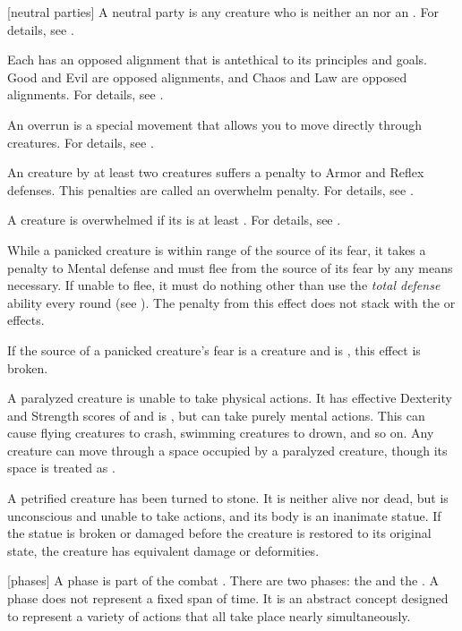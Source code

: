 [neutral parties] A neutral party is any creature who is neither an  nor an .
For details, see .

 Each  has an opposed alignment that is antethical to its principles and goals.
Good and Evil are opposed alignments, and Chaos and Law are opposed alignments.
For details, see .

 An overrun is a special movement that allows you to move directly through creatures.
For details, see .

 An creature  by at least two creatures suffers a  penalty to Armor and Reflex defenses.
This penalties are called an overwhelm penalty.
For details, see .

 A creature is overwhelmed if its  is at least .
For details, see .

 While a panicked creature is within \rngmed range of the source of its fear, it takes a  penalty to Mental defense and must flee from the source of its fear by any means necessary.
If unable to flee, it must do nothing other than use the \textit{total defense} ability every round (see ).
The penalty from this effect does not stack with the  or  effects.

If the source of a panicked creature's fear is a creature and is , this effect is broken.

 A paralyzed creature is unable to take physical actions. It has effective Dexterity and Strength scores of  and is \helpless, but can take purely mental actions. This can cause flying creatures to crash, swimming creatures to drown, and so on. Any creature can move through a space occupied by a paralyzed creature, though its space is treated as .

 A petrified creature has been turned to stone. It is neither alive nor dead, but is unconscious and unable to take actions, and its body is an inanimate statue. If the statue is broken or damaged before the creature is restored to its original state, the creature has equivalent damage or deformities.

[phases] A phase is part of the combat .
There are two phases: the  and the .
A phase does not represent a fixed span of time.
It is an abstract concept designed to represent a variety of actions that all take place nearly simultaneously.

